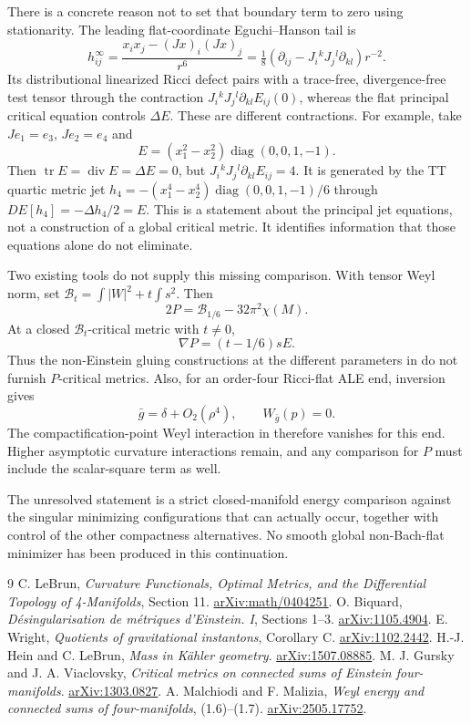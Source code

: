 \documentclass[11pt]{article}
\newcommand{\tr}{\operatorname{tr}}
\begin{document}
There is a concrete reason not to set that boundary term to zero using
stationarity. The leading flat-coordinate Eguchi--Hanson tail is
\[
 h^\infty_{ij}=\frac{x_i x_j-(Jx)_i(Jx)_j}{r^6}
 =\tfrac18(\partial_{ij}-J_i{}^kJ_j{}^l\partial_{kl})r^{-2}.
\]
Its distributional linearized Ricci defect pairs with a trace-free,
divergence-free test tensor through the contraction
$J_i{}^kJ_j{}^l\partial_{kl}E_{ij}(0)$, whereas the flat principal
critical equation controls $\Delta E$. These are different contractions.
For example, take $Je_1=e_3$, $Je_2=e_4$ and
\[
 E=(x_1^2-x_2^2)\operatorname{diag}(0,0,1,-1).
\]
Then $\tr E=\operatorname{div}E=\Delta E=0$, but
$J_i{}^kJ_j{}^l\partial_{kl}E_{ij}=4$.
It is generated by the TT quartic metric jet
$h_4=-(x_1^4-x_2^4)\operatorname{diag}(0,0,1,-1)/6$ through
$DE[h_4]=-\Delta h_4/2=E$.
This is a statement about the principal jet equations, not a construction
of a global critical metric. It identifies information that those equations
alone do not eliminate.

Two existing tools do not supply this missing comparison. With tensor
Weyl norm, set $\mathcal B_t=\int|W|^2+t\int s^2$. Then
\[
 2P=\mathcal B_{1/6}-32\pi^2\chi(M).
\]
At a closed $\mathcal B_t$-critical metric with $t\ne0$,
\[
 \nabla P=(t-1/6)sE.
\]
Thus the non-Einstein gluing constructions at the different parameters
in \cite{GV} do not furnish $P$-critical metrics. Also, for an order-four
Ricci-flat ALE end, inversion gives
\[
 \bar g=\delta+O_2(\rho^4),\qquad W_{\bar g}(p)=0.
\]
The compactification-point Weyl interaction in \cite{MM} therefore
vanishes for this end. Higher asymptotic curvature interactions remain,
and any comparison for $P$ must include the scalar-square term as well.

The unresolved statement is a strict closed-manifold energy comparison
against the singular minimizing configurations that can actually occur,
together with control of the other compactness alternatives. No smooth
global non-Bach-flat minimizer has been produced in this continuation.

\begin{thebibliography}{9}
 C. LeBrun, \emph{Curvature Functionals, Optimal Metrics,
and the Differential Topology of 4-Manifolds}, Section 11.
\href{https://arxiv.org/abs/math/0404251}{arXiv:math/0404251}.
 O. Biquard, \emph{D\'esingularisation de m\'etriques
d'Einstein. I}, Sections 1--3.
\href{https://arxiv.org/abs/1105.4904}{arXiv:1105.4904}.
 E. Wright, \emph{Quotients of gravitational instantons},
Corollary C. \href{https://arxiv.org/abs/1102.2442}{arXiv:1102.2442}.
 H.-J. Hein and C. LeBrun, \emph{Mass in K\"ahler
geometry}. \href{https://arxiv.org/abs/1507.08885}{arXiv:1507.08885}.
 M. J. Gursky and J. A. Viaclovsky, \emph{Critical metrics
on connected sums of Einstein four-manifolds}.
\href{https://arxiv.org/abs/1303.0827}{arXiv:1303.0827}.
 A. Malchiodi and F. Malizia, \emph{Weyl energy and connected
sums of four-manifolds}, (1.6)--(1.7).
\href{https://arxiv.org/abs/2505.17752}{arXiv:2505.17752}.
\end{thebibliography}
\end{document}
